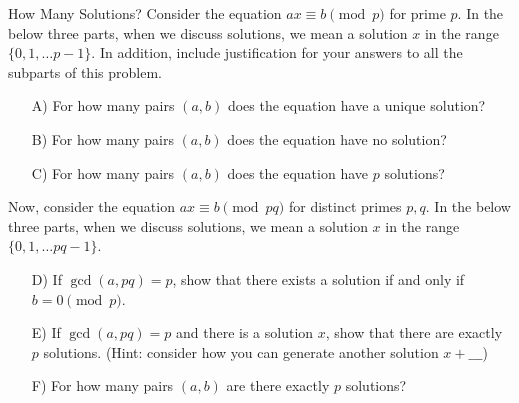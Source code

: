 \begin{homeworkProblem}{How Many Solutions?}
    Consider the equation $ax \equiv b \pmod p$ for prime $p$. In the below three parts, when we discuss solutions, we mean a solution $x$ in the range $\{0, 1, \dots p-1\}$. In addition, include justification for your answers to all the subparts of this problem.

    \begin{itemize}
        \item[A)] For how many pairs $(a,b)$ does the equation have a unique solution?
        \item[B)] For how many pairs $(a,b)$ does the equation have no solution?
        \item[C)] For how many pairs $(a,b)$ does the equation have $p$ solutions?
    \end{itemize}

    Now, consider the equation $ax \equiv b \pmod{pq}$ for distinct primes $p,q$. In the below three parts, when we discuss solutions, we mean a solution $x$ in the range $\{0, 1, \dots pq-1\}$.

    \begin{itemize}
        \item[D)] If $\gcd(a, pq) = p$, show that there exists a solution if and only if $b = 0 \pmod p$. 
        \item[E)] If $\gcd(a, pq) = p$ and there is a solution $x$, show that there are exactly $p$ solutions. (Hint: consider how you can generate another solution $x + \_\_\_$)
        \item[F)] For how many pairs $(a,b)$ are there exactly $p$ solutions? 
    \end{itemize}
    
\end{homeworkProblem}